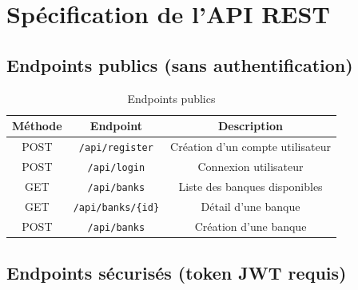 \documentclass[12pt,a4paper]{article}
\newcommand{\tableheader}[1]{\textbf{#1}}
\begin{document}
\section{Spécification de l'API REST}

\subsection{Endpoints publics (sans authentification)}

\begin{table}[H]
    \centering
    \renewcommand{\arraystretch}{1.3}
    \begin{tabular}{|c|c|c|}
        \hline
        \tableheader{Méthode} & \tableheader{Endpoint} & \tableheader{Description} \\
        \hline
        POST & \texttt{/api/register} & Création d'un compte utilisateur \\
        \hline
        POST & \texttt{/api/login} & Connexion utilisateur \\
        \hline
        GET & \texttt{/api/banks} & Liste des banques disponibles \\
        \hline
        GET & \texttt{/api/banks/\{id\}} & Détail d'une banque \\
        \hline
        POST & \texttt{/api/banks} & Création d'une banque \\
        \hline
    \end{tabular}
    \caption{Endpoints publics}
\end{table}

\subsection{Endpoints sécurisés (token JWT requis)}
\end{document}
